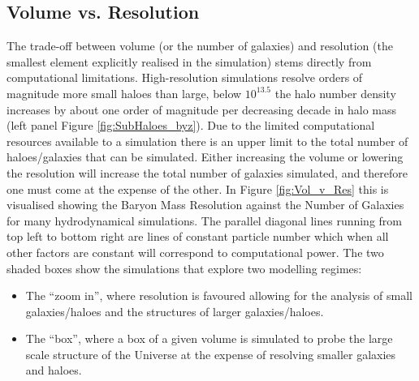 \subsection{Volume vs. Resolution}
The trade-off between volume (or the number of galaxies) and resolution (the smallest element explicitly realised in the simulation) stems directly from computational limitations. High-resolution simulations resolve orders of magnitude more small haloes than large, below $10^{13.5}$ the halo number density increases by about one order of magnitude per decreasing decade in halo mass (left panel Figure \ref{fig:SubHaloes_byz}). Due to the limited computational resources available to a simulation there is an upper limit to the total number of haloes/galaxies that can be simulated. Either increasing the volume or lowering the resolution will increase the total number of galaxies simulated, and therefore one must come at the expense of the other. In Figure \ref{fig:Vol_v_Res} this is visualised showing the Baryon Mass Resolution against the Number of Galaxies for many hydrodynamical simulations. The parallel diagonal lines running from top left to bottom right are lines of constant particle number which when all other factors are constant will correspond to computational power. The two shaded boxes show the simulations that explore two modelling regimes:
\begin{itemize}
    \item The ``zoom in'', where resolution is favoured allowing for the analysis of small galaxies/haloes and the structures of larger galaxies/haloes.
    \item The ``box'', where a box of a given volume is simulated to probe the large scale structure of the Universe at the expense of resolving smaller galaxies and haloes.
\end{itemize}


